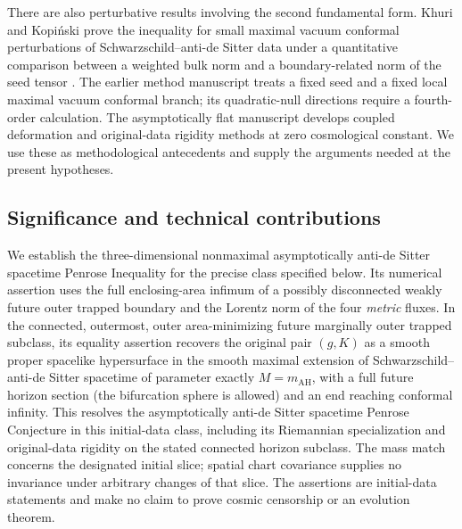 There are also perturbative results involving the second fundamental form.
Khuri and Kopi\'nski prove the inequality for small maximal vacuum conformal
perturbations of Schwarzschild--anti-de Sitter data under a quantitative
comparison between a weighted bulk norm and a boundary-related norm of the
seed tensor \cite{khurikopinski2023}.
The earlier method manuscript \cite{internalads} treats a fixed seed and a
fixed local maximal vacuum conformal branch; its quadratic-null directions
require a fourth-order calculation.  The asymptotically flat manuscript
\cite{internalflat} develops coupled deformation and original-data rigidity
methods at zero cosmological constant.  We use these as methodological
antecedents and supply the arguments needed at the present hypotheses.

\subsection{Significance and technical contributions}\label{hist:significance}

We establish the three-dimensional nonmaximal asymptotically anti-de Sitter
spacetime Penrose Inequality for the precise class specified below.
Its numerical assertion uses the full enclosing-area infimum
of a possibly disconnected weakly future outer trapped
boundary and the Lorentz norm of the four \emph{metric} fluxes.
In the connected, outermost, outer area-minimizing future marginally
outer trapped subclass, its equality assertion recovers the original pair
$(g,K)$ as a smooth proper spacelike hypersurface in the smooth maximal
extension of Schwarzschild--anti-de Sitter spacetime of parameter exactly
$M=m_{\mathrm{AH}}$, with a full future horizon section (the bifurcation
sphere is allowed) and an end reaching conformal infinity.
This resolves the asymptotically anti-de Sitter spacetime Penrose Conjecture
in this initial-data class, including its Riemannian specialization and
original-data rigidity on the stated connected horizon subclass.
The mass match concerns the designated initial
slice; spatial chart covariance supplies no invariance under arbitrary
changes of that slice.  The assertions are initial-data statements and
make no claim to prove cosmic censorship or an evolution theorem.

